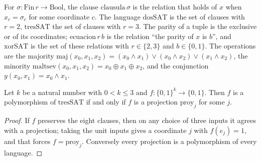 \begin{definition}
  \label{def:structure-languages}
  \leanok
  For $\sigma : \mathrm{Fin}\,r \to \mathrm{Bool}$, the clause $\mathrm{clausula}\,\sigma$ is the
  relation that holds of $x$ when $x_c = \sigma_c$ for some coordinate $c$. The language
  $\mathrm{dosSAT}$ is the set of clauses with $r = 2$, $\mathrm{tresSAT}$ the set of clauses with
  $r = 3$. The parity of a tuple is the exclusive or of its coordinates; $\mathrm{ecuacion}\,r\,b$
  is the relation ``the parity of $x$ is $b$'', and $\mathrm{xorSAT}$ is the set of these
  relations with $r \in \{2, 3\}$ and $b \in \{0,1\}$. The operations are the majority
  $\mathrm{maj}(x_0,x_1,x_2) = (x_0 \wedge x_1) \vee (x_0 \wedge x_2) \vee (x_1 \wedge x_2)$, the
  minority $\mathrm{maltsev}(x_0,x_1,x_2) = x_0 \oplus x_1 \oplus x_2$, and the conjunction
  $y(x_0,x_1) = x_0 \wedge x_1$.
  \own{}
\end{definition}

\begin{theorem}
  \label{thm:structure-tressat-pol}
  \leanok
  Let $k$ be a natural number with $0 < k \le 3$ and $f : \{0,1\}^k \to \{0,1\}$. Then $f$ is a
  polymorphism of $\mathrm{tresSAT}$ if and only if $f$ is a projection $\mathrm{proy}_j$ for some
  $j$.
\end{theorem}

\begin{proof}
  \leanok
  If $f$ preserves the eight clauses, then on any choice of three inputs it agrees with a
  projection; taking the unit inputs gives a coordinate $j$ with $f(e_j) = 1$, and that forces $f
  = \mathrm{proy}_j$. Conversely every projection is a polymorphism of every language.
\end{proof}


